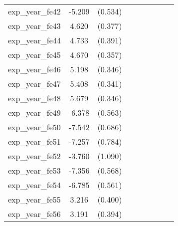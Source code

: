 {\begin{tabular}{l*{4}{cc}}
exp\_year\_fe42&   -5.209\sym{***}&  (0.534)&                  &         &                  &         &                  &         \\
exp\_year\_fe43&    4.620\sym{***}&  (0.377)&                  &         &                  &         &                  &         \\
exp\_year\_fe44&    4.733\sym{***}&  (0.391)&                  &         &                  &         &                  &         \\
exp\_year\_fe45&    4.670\sym{***}&  (0.357)&                  &         &                  &         &                  &         \\
exp\_year\_fe46&    5.198\sym{***}&  (0.346)&                  &         &                  &         &                  &         \\
exp\_year\_fe47&    5.408\sym{***}&  (0.341)&                  &         &                  &         &                  &         \\
exp\_year\_fe48&    5.679\sym{***}&  (0.346)&                  &         &                  &         &                  &         \\
exp\_year\_fe49&   -6.378\sym{***}&  (0.563)&                  &         &                  &         &                  &         \\
exp\_year\_fe50&   -7.542\sym{***}&  (0.686)&                  &         &                  &         &                  &         \\
exp\_year\_fe51&   -7.257\sym{***}&  (0.784)&                  &         &                  &         &                  &         \\
exp\_year\_fe52&   -3.760\sym{***}&  (1.090)&                  &         &                  &         &                  &         \\
exp\_year\_fe53&   -7.356\sym{***}&  (0.568)&                  &         &                  &         &                  &         \\
exp\_year\_fe54&   -6.785\sym{***}&  (0.561)&                  &         &                  &         &                  &         \\
exp\_year\_fe55&    3.216\sym{***}&  (0.400)&                  &         &                  &         &                  &         \\
exp\_year\_fe56&    3.191\sym{***}&  (0.394)&                  &         &                  &         &                  &         \\

\end{tabular}}
